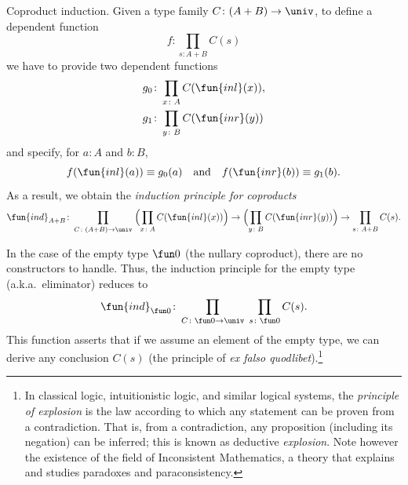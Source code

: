 \begin{lpar}{Coproduct induction.}\label{lpar:coproduct-induction}
    Given a type family $C\colon(A+B)\to\univ$, to define a dependent function
    \[
        f\colon\prod_{s\colon A+B}C(s)
    \]
    we have to provide two dependent functions
    \begin{align*}
        g_0 &\colon \prod_{x\colon A}C(\fun{inl}(x)),\\
        g_1 &\colon \prod_{y\colon B}C(\fun{inr}(y))
    \end{align*}
    and specify, for $a\colon A$ and $b\colon B$,
    \[
        f(\fun{inl}(a))\equiv g_0(a)\quad\text{and}\quad
        f(\fun{inr}(b))\equiv g_1(b).
    \]
    As a result, we obtain the \textsl{induction principle for coproducts}
    \begin{equation}\label{eq:coproduct-ind}
        \fun{ind}_{A+B}\colon\prod_{C\colon(A+B)\to\univ}\;
            \Bigl(\prod_{x\colon A}C(\fun{inl}(x))\Bigr)
            \to
            \Bigl(\prod_{y\colon B}C(\fun{inr}(y))\Bigr)
            \to
            \prod_{s\colon A+B}C(s).
    \end{equation}
        
    In the case of the empty type $\fun0$ (the nullary coproduct), there are no constructors to handle. Thus, the induction principle for the empty type (a.k.a.~eliminator) reduces to
    \[
        \fun{ind}_{\fun0}\colon\prod_{C\colon\fun0\to\univ}\;
            \prod_{s\colon\fun0}C(s).
    \]
    This function asserts that if we assume an element of the empty type, we can derive any conclusion $C(s)$ (the principle of \textsl{ex falso quodlibet}).\footnote{In classical logic, intuitionistic logic, and similar logical systems, the \textsl{principle of explosion} is the law according to which any statement can be proven from a contradiction. That is, from a contradiction, any proposition (including its negation) can be inferred; this is known as deductive \textsl{explosion}. Note however the existence of the field of Inconsistent Mathematics, a theory that explains and studies paradoxes and paraconsistency.}
\end{lpar}

